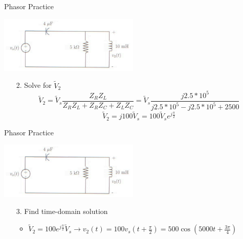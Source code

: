    \begin{frame}{Phasor Practice}
        \begin{center}
            \includegraphics[width=0.5\textwidth]{./images/phasor-practice.png}
        \end{center}
        \begin{enumerate}
            \item[2.] Solve for $\tilde{V}_2$
            $$\tilde{V}_2=\tilde{V}_s\frac{Z_RZ_L}{Z_RZ_L+Z_RZ_C+Z_LZ_C}=\tilde{V}_s\frac{j2.5*10^5}{j2.5*10^5-j2.5*10^5+2500}$$
            $$\tilde{V}_2=j100\tilde{V}_s=100\tilde{V}_se^{j\frac{\pi}{2}}$$
        \end{enumerate}
    \end{frame}
    
    \begin{frame}{Phasor Practice}
        \begin{center}
            \includegraphics[width=0.5\textwidth]{./images/phasor-practice.png}
        \end{center}
        \begin{enumerate}
            \item[3.] Find time-domain solution
            \begin{itemize}
                \item $\tilde{V}_2=100e^{j\frac{\pi}{2}}\tilde{V}_s\rightarrow v_2(t)=100v_s(t+\frac{\pi}{2})=500\cos(5000t+\frac{3\pi}{4})$
            \end{itemize}
        \end{enumerate}
    \end{frame}
	
